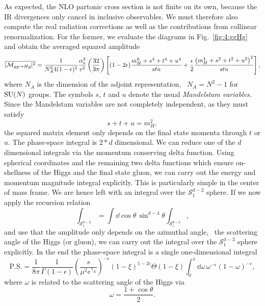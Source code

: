 As expected, the \acs{NLO} partonic cross section is not finite on its own, because the \acs{IR} divergences only cancel in inclusive observables. We must therefore also compute the real radiation corrections as well as the contributions from collinear renormalization. For the former, we evaluate the diagrams in Fig.~\ref{fig:4:ggHg} and obtain the averaged squared amplitude
\begin{equation}
\overline{|\mathcal{M}_{gg \rightarrow H g}|^2} = \frac{1}{N_A^2 4 (1 - \epsilon)^2} \frac{\alpha_s^3}{v^2} \left(\frac{32}{3 \pi} \right) \left[ (1 - 2 \epsilon) \frac{m_H^8 + s^4 + t^4 + u^4}{stu} + \frac{\epsilon}{2} \frac{\left(m_H^4 + s^2 + t^2 + u^2 \right)^2}{stu} \right],
\label{eq:4:ggHg_Amp}
\end{equation}
where $N_A$ is the dimension of the adjoint representation, \ie\ $N_A = N^2 - 1$ for $\mathrm{SU}(N)$ groups. The symbols $s$, $t$ and $u$ denote the usual \textit{Mandelstam variables}. Since the Mandelstam variables are not completely independent, as they must satisfy
\begin{equation}
  s + t + u = m_H^2,
\end{equation}
the squared matrix element only depends on the final state momenta through $t$ or $u$. The phase-space integral is $2*d$ dimensional. We can reduce one of the $d$ dimensional integrals via the momentum conserving delta function. Using spherical coordinates and the remaining two delta functions which ensure on-shellness of the Higgs and the final state gluon, we can carry out the energy and momentum magnitude integral explicitly. This is particularly simple in the center of mass frame. We are hence left with an integral over the $\mathcal{S}_1^{d - 2}$ sphere. If we now apply the recursion relation
\begin{equation}
\int_{\mathcal{S}_1^{d - 2}} = \int \dd\!\cos \theta \, \sin^{d - 4} \theta \int_{\mathcal{S}_1^{d - 3}},
\end{equation}
and use that the amplitude only depends on the azimuthal angle, \ie\ the scattering angle of the Higgs (or gluon), we can carry out the integral over the $\mathcal{S}_1^{d - 3}$ sphere explicitly. In the end the phase-space integral is a single one-dimensional integral
\begin{equation}
\text{P.S.} = \frac{1}{8 \pi} \frac{1}{\Gamma (1 - \epsilon)} \left(\frac{s}{\mu^2 e^{\gamma_E}}\right)^{-\epsilon} \left(1 - \xi \right)^{1 - 2 \epsilon} \Theta (1 - \xi) \int_0^1 \dd \omega \, \omega^{-\epsilon} (1 - \omega)^{-\epsilon},
\end{equation}
where $\omega$ is related to the scattering angle of the Higgs via
\begin{equation}
\omega = \frac{1 + \cos \theta}{2}.
\end{equation}

